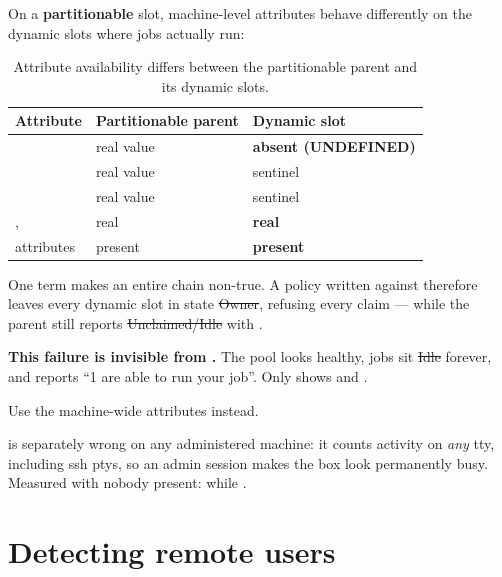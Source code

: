 On a \textbf{partitionable} slot, machine-level attributes behave differently on
the dynamic slots where jobs actually run:

\begin{table}[H]
\centering
\begin{tabularx}{\textwidth}{L{0.34\textwidth} L{0.22\textwidth} Y}
\toprule
\textbf{Attribute} & \textbf{Partitionable parent} & \textbf{Dynamic slot} \\
\midrule
{} & real value & \textbf{absent (UNDEFINED)} \\
 & real value &  sentinel \\
 & real value &  sentinel \\
,  & real & \textbf{real} \\
 attributes & present & \textbf{present} \\
\bottomrule
\end{tabularx}
\caption{Attribute availability differs between the partitionable parent and its dynamic slots.}
\end{table}

One  term makes an entire \kn{\&\&} chain non-true. A policy written
against  therefore leaves every dynamic slot in state \st{Owner},
refusing every claim --- while the parent still reports \st{Unclaimed/Idle} with
.

\begin{trap}
\textbf{This failure is invisible from .} The pool looks
healthy, jobs sit \st{Idle} forever, and  reports
``1 are able to run your job''. Only  shows
 and .
\end{trap}

Use the machine-wide  attributes instead.

 is separately wrong on any administered machine: it counts
activity on \emph{any} tty, including ssh ptys, so an admin session makes the box
look permanently busy. Measured with nobody present:  while
.

\section{Detecting remote users}

